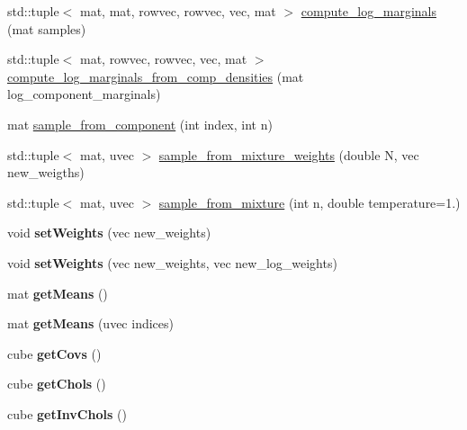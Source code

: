 \begin{DoxyCompactItemize}
\item 
std\+::tuple$<$ mat, mat, rowvec, rowvec, vec, mat $>$ \hyperlink{classGMM_a11d50f8336e3f0b4371fa4c7c023e11f}{compute\+\_\+log\+\_\+marginals} (mat samples)
\item 
std\+::tuple$<$ mat, rowvec, rowvec, vec, mat $>$ \hyperlink{classGMM_a03b69ac93de1b177102fc9378665f20b}{compute\+\_\+log\+\_\+marginals\+\_\+from\+\_\+comp\+\_\+densities} (mat log\+\_\+component\+\_\+marginals)
\item 
mat \hyperlink{classGMM_a5e5c1278fc67c3cb4b5cdeeb9390ab98}{sample\+\_\+from\+\_\+component} (int index, int n)
\item 
std\+::tuple$<$ mat, uvec $>$ \hyperlink{classGMM_ad7687ba93ab195673c26d02690d14d27}{sample\+\_\+from\+\_\+mixture\+\_\+weights} (double N, vec new\+\_\+weigths)
\item 
std\+::tuple$<$ mat, uvec $>$ \hyperlink{classGMM_afb3f91ba6e939739198a49c85c92ace4}{sample\+\_\+from\+\_\+mixture} (int n, double temperature=1.)
\item 
void {\bfseries set\+Weights} (vec new\+\_\+weights)\hypertarget{classGMM_a1326b4c55a66445adb3888d1a77bb2cb}{}\label{classGMM_a1326b4c55a66445adb3888d1a77bb2cb}

\item 
void {\bfseries set\+Weights} (vec new\+\_\+weights, vec new\+\_\+log\+\_\+weights)\hypertarget{classGMM_a79c00e9de57111610b41fd98577b7b6a}{}\label{classGMM_a79c00e9de57111610b41fd98577b7b6a}

\item 
mat {\bfseries get\+Means} ()\hypertarget{classGMM_ae14f838f611896e02074e897247f461b}{}\label{classGMM_ae14f838f611896e02074e897247f461b}

\item 
mat {\bfseries get\+Means} (uvec indices)\hypertarget{classGMM_adeb0e2fd08493b3fd182286566a27a89}{}\label{classGMM_adeb0e2fd08493b3fd182286566a27a89}

\item 
cube {\bfseries get\+Covs} ()\hypertarget{classGMM_a88fd853731318d167e32b220debcf3c8}{}\label{classGMM_a88fd853731318d167e32b220debcf3c8}

\item 
cube {\bfseries get\+Chols} ()\hypertarget{classGMM_a84da191cb14375e572f192322b35ac6a}{}\label{classGMM_a84da191cb14375e572f192322b35ac6a}

\item 
cube {\bfseries get\+Inv\+Chols} ()\hypertarget{classGMM_a0cede71e7f6fb12cc7710567a3f4feef}{}\label{classGMM_a0cede71e7f6fb12cc7710567a3f4feef}


\end{DoxyCompactItemize}
